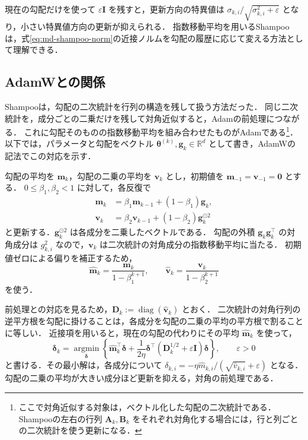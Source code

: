 \documentclass[../main.tex]{subfiles}
\begin{document}
現在の勾配だけを使って $\varepsilon\bm{I}$ を残すと，更新方向の特異値は
$\sigma_{k,i}/\sqrt{\sigma_{k,i}^2+\varepsilon}$ となり，小さい特異値方向の更新が抑えられる．
指数移動平均を用いるShampooは，式\eqref{eq:md-shampoo-norm}の近接ノルムを勾配の履歴に応じて変える方法として理解できる．

\subsection{AdamWとの関係}
\label{subsec:md-adamw}

Shampooは，勾配の二次統計を行列の構造を残して扱う方法だった．
同じ二次統計を，成分ごとの二乗だけを残して対角近似すると，Adamの前処理につながる．
これに勾配そのものの指数移動平均を組み合わせたものがAdamである\footnote{ここで対角近似する対象は，ベクトル化した勾配の二次統計である．Shampooの左右の行列 $\bm{A}_k,\bm{B}_k$ をそれぞれ対角化する場合には，行と列ごとの二次統計を使う更新になる．}．
以下では，パラメータと勾配をベクトル $\bm{\theta}^{(k)},\bm{g}_k\in\mathbb{R}^d$ として書き，AdamWの記法でこの対応を示す．

勾配の平均を $\bm{m}_k$，勾配の二乗の平均を $\bm{v}_k$ とし，初期値を $\bm{m}_{-1}=\bm{v}_{-1}=\bm{0}$ とする．
$0\leq\beta_1,\beta_2<1$ に対して，各反復で
\begin{equation}
  \begin{aligned}
    \bm{m}_k&=\beta_1\bm{m}_{k-1}+(1-\beta_1)\bm{g}_k,\\
    \bm{v}_k&=\beta_2\bm{v}_{k-1}+(1-\beta_2)\bm{g}_k^{\odot2}
  \end{aligned}
  \label{eq:md-adam-moments}
\end{equation}
と更新する．$\bm{g}_k^{\odot2}$ は各成分を二乗したベクトルである．
勾配の外積 $\bm{g}_k\bm{g}_k^\top$ の対角成分は $g_{k,i}^2$ なので，$\bm{v}_k$ は二次統計の対角成分の指数移動平均に当たる．
初期値ゼロによる偏りを補正するため，
\begin{equation}
  \widehat{\bm{m}}_k=\frac{\bm{m}_k}{1-\beta_1^{k+1}},
  \qquad
  \widehat{\bm{v}}_k=\frac{\bm{v}_k}{1-\beta_2^{k+1}}
  \label{eq:md-adam-bias-correction}
\end{equation}
を使う\cite{kingma2015adam}．

前処理との対応を見るため，$\bm{D}_k:=\operatorname{diag}(\widehat{\bm{v}}_k)$ とおく．
二次統計の対角行列の逆平方根を勾配に掛けることは，各成分を勾配の二乗の平均の平方根で割ることに等しい．
近接項を用いると，現在の勾配の代わりにその平均 $\widehat{\bm{m}}_k$ を使って，
\begin{equation}
  \bm{\delta}_k=\underset{\bm{\delta}}{\operatorname{argmin}}
  \left\{\widehat{\bm{m}}_k^\top\bm{\delta}
  +\frac{1}{2\eta}\bm{\delta}^\top
    (\bm{D}_k^{1/2}+\varepsilon\bm{I})\bm{\delta}\right\},
  \qquad\varepsilon>0
  \label{eq:md-adam-proximity}
\end{equation}
と書ける．その最小解は，各成分について
$\delta_{k,i}=-\eta\widehat{m}_{k,i}/(\sqrt{\widehat{v}_{k,i}}+\varepsilon)$ となる．
勾配の二乗の平均が大きい成分ほど更新を抑える，対角の前処理である．
\end{document}
